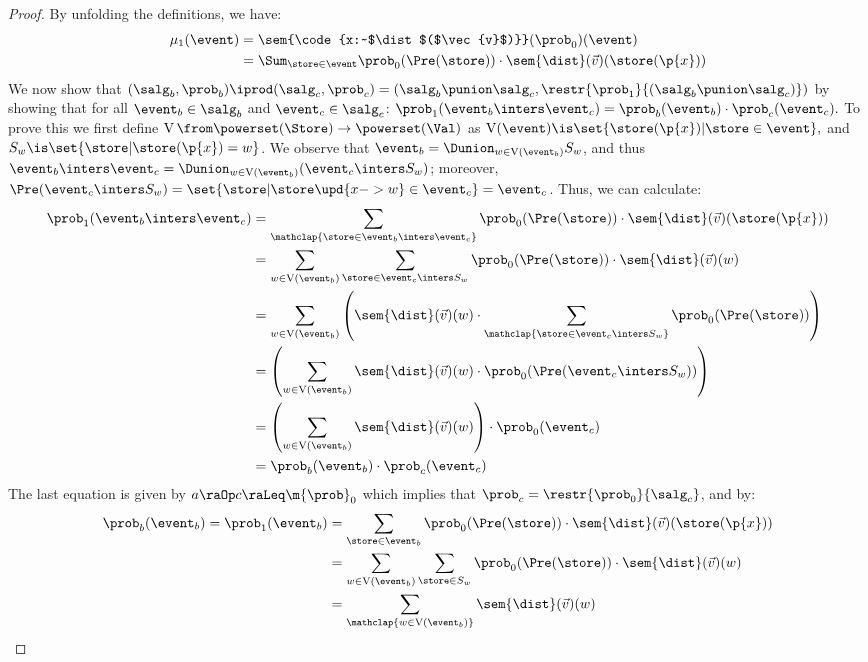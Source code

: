 \documentclass[acmsmall,nonacm,screen,appendix]{acmart}
\begin{document}
\begin{proof}
  By unfolding the definitions, we have:
  \begin{align*}
    \mu_1(\event) &=
      \sem{\code{x:~$\dist$($\vec{v}$)}}(\prob_0)(\event)
\\&=
      \Sum_{\store \in \event}
        \prob_0(\Pre(\store)) \cdot \sem{\dist}(\vec{v})(\store(\p{x}))
  \end{align*}
  We now show that
  $
    (\salg_b, \prob_b) \iprod (\salg_c, \prob_c)
    =
    (\salg_b \punion \salg_c, \restr{\prob_1}{(\salg_b \punion \salg_c)})
  $
  by showing that
  for all $\event_b \in \salg_b$ and
          $\event_c \in \salg_c$:
  $
    \prob_1(\event_b \inters \event_c)
    =
    \prob_b(\event_b) \cdot \prob_c(\event_c).
  $
  \newcommand{\valOf}{\operatorname{V}}
  To prove this we first
  define $\valOf \from \powerset(\Store) \to \powerset(\Val)$ as
  $
    \valOf(\event) \is
      \set{ \store(\p{x}) | \store \in \event },
  $
  and $ S_w \is \set{ \store | \store(\p{x}) = w } $.
  We observe that
  $
    \event_b   = \Dunion_{w \in \valOf(\event_b)} S_w
  $, and thus
  $
    \event_b \inters \event_c
    = \Dunion_{w \in \valOf(\event_b)} (\event_c \inters S_w)
  $;
  moreover,
  $
    \Pre(\event_c \inters S_w)
    = \set{ \store | \store\upd{x->w} \in \event_c } = \event_c
  $.
  Thus, we can calculate:
  \begin{align*}
    \prob_1(\event_b \inters \event_c)
      &=
    \sum_{\mathclap{\store \in \event_b \inters \event_c}}
      \prob_0(\Pre(\store)) \cdot \sem{\dist}(\vec{v})(\store(\p{x}))
    \\&=
    \sum_{w \in \valOf(\event_b)}
    \sum_{\store \in \event_c \inters S_{w}}
      \prob_0(\Pre(\store)) \cdot
      \sem{\dist}(\vec{v})(w)
    \\&=
    \sum_{w \in \valOf(\event_b)}
    \left(
      \sem{\dist}(\vec{v})(w) \cdot
      \sum_{\mathclap{\store \in \event_c \inters S_{w}}}
      \prob_0(\Pre(\store))
    \right)
    \\&=
    \left(
    \sum_{w \in \valOf(\event_b)}
      \sem{\dist}(\vec{v})(w)
      \cdot \prob_0(\Pre(\event_c \inters S_w))
    \right)
    \\&=
    \left(
    \sum_{w \in \valOf(\event_b)}
      \sem{\dist}(\vec{v})(w)
    \right)
    \cdot \prob_0(\event_c)
    \\&=
    \prob_b(\event_b) \cdot  \prob_c(\event_c)
  \end{align*}
The last equation is given by
  $ a\raOp c \raLeq  \m{\prob}_0 $ which implies that $ \prob_c = \restr{\prob_0}{\salg_c} $, and by:
  \begin{align*}
    \prob_b(\event_b)
      =
    \prob_1(\event_b)
      &=
    \sum_{\store \in \event_b}
      \prob_0(\Pre(\store)) \cdot \sem{\dist}(\vec{v})(\store(\p{x}))
    \\&=
    \sum_{w \in \valOf(\event_b)}
      \sum_{\store \in S_w}
        \prob_0(\Pre(\store)) \cdot \sem{\dist}(\vec{v})(w)
    \\&=
    \sum_{\mathclap{w \in \valOf(\event_b)}}
      \sem{\dist}(\vec{v})(w)
  \end{align*}


\end{proof}
\end{document}

